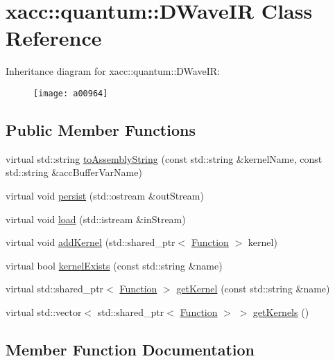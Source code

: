 \hypertarget{a00964}{}\section{xacc\+:\+:quantum\+:\+:D\+Wave\+IR Class Reference}
\label{a00964}
Inheritance diagram for xacc\+:\+:quantum\+:\+:D\+Wave\+IR\+:\begin{figure}[H]
\begin{center}
\leavevmode
\texttt{[image: a00964]}
\end{center}
\end{figure}
\subsection*{Public Member Functions}
\begin{DoxyCompactItemize}
\item 
virtual std\+::string \hyperlink{a00964_ac19ad098d5bbfe769809c10e26ebebc6}{to\+Assembly\+String} (const std\+::string \&kernel\+Name, const std\+::string \&acc\+Buffer\+Var\+Name)
\item 
virtual void \hyperlink{a00964_adac268c6fa2234902efeb9b3c07c0ac2}{persist} (std\+::ostream \&out\+Stream)
\item 
virtual void \hyperlink{a00964_a94d814172ec30c7ed32e6ab52bc2a41a}{load} (std\+::istream \&in\+Stream)
\item 
virtual void \hyperlink{a00964_a7e1ddff2771233dc45f60a6b7e15ef63}{add\+Kernel} (std\+::shared\+\_\+ptr$<$ \hyperlink{a01124}{Function} $>$ kernel)
\item 
virtual bool \hyperlink{a00964_ace9b8c6f4f29e32c8482fec4eacb637a}{kernel\+Exists} (const std\+::string \&name)
\item 
virtual std\+::shared\+\_\+ptr$<$ \hyperlink{a01124}{Function} $>$ \hyperlink{a00964_ac4295dfef98c94d7154a4fd39a6e5d1c}{get\+Kernel} (const std\+::string \&name)
\item 
virtual std\+::vector$<$ std\+::shared\+\_\+ptr$<$ \hyperlink{a01124}{Function} $>$ $>$ \hyperlink{a00964_accffbb279cb1f67e0fe79c603fe7a949}{get\+Kernels} ()
\end{DoxyCompactItemize}


\subsection{Member Function Documentation}
\mbox{\label{a00964_a7e1ddff2771233dc45f60a6b7e15ef63}} 
